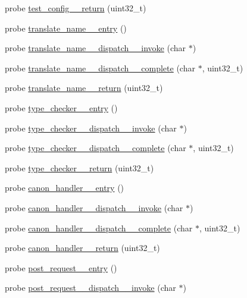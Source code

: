 \begin{DoxyCompactItemize}
\item 
probe \hyperlink{apache__probes_8d_a3b8cf4cf0330f7ebe23c3e14642e0d8b}{test\+\_\+config\+\_\+\+\_\+return} (uint32\+\_\+t)
\item 
probe \hyperlink{apache__probes_8d_ae606fd6e5357ce6847f930460e9aa293}{translate\+\_\+name\+\_\+\+\_\+entry} ()
\item 
probe \hyperlink{apache__probes_8d_a65c3cea1dc4b20ad04e450278219a3a0}{translate\+\_\+name\+\_\+\+\_\+dispatch\+\_\+\+\_\+invoke} (char $\ast$)
\item 
probe \hyperlink{apache__probes_8d_a0b8d45d195da1f21a4270103e4fae5e8}{translate\+\_\+name\+\_\+\+\_\+dispatch\+\_\+\+\_\+complete} (char $\ast$, uint32\+\_\+t)
\item 
probe \hyperlink{apache__probes_8d_a58fc6cb50bea00f01041b081ec217e69}{translate\+\_\+name\+\_\+\+\_\+return} (uint32\+\_\+t)
\item 
probe \hyperlink{apache__probes_8d_ad76c4fac2c9a4adf8c6f219048fbad09}{type\+\_\+checker\+\_\+\+\_\+entry} ()
\item 
probe \hyperlink{apache__probes_8d_ae926644a3b2aa33a919a04205e4074ad}{type\+\_\+checker\+\_\+\+\_\+dispatch\+\_\+\+\_\+invoke} (char $\ast$)
\item 
probe \hyperlink{apache__probes_8d_a5963d29d6437345691b624f52e7b9feb}{type\+\_\+checker\+\_\+\+\_\+dispatch\+\_\+\+\_\+complete} (char $\ast$, uint32\+\_\+t)
\item 
probe \hyperlink{apache__probes_8d_a8e8b60dc5433a0237d2a58a4b9490a00}{type\+\_\+checker\+\_\+\+\_\+return} (uint32\+\_\+t)
\item 
probe \hyperlink{apache__probes_8d_aee0d2dbeefe4f5f6b6fe9d4c2e18a552}{canon\+\_\+handler\+\_\+\+\_\+entry} ()
\item 
probe \hyperlink{apache__probes_8d_a0b042051a18d376cdca0937e6c432ade}{canon\+\_\+handler\+\_\+\+\_\+dispatch\+\_\+\+\_\+invoke} (char $\ast$)
\item 
probe \hyperlink{apache__probes_8d_a0157a8735d46cea72182dd007aeb280e}{canon\+\_\+handler\+\_\+\+\_\+dispatch\+\_\+\+\_\+complete} (char $\ast$, uint32\+\_\+t)
\item 
probe \hyperlink{apache__probes_8d_a479aca7f897a7a5de0f06c336077d538}{canon\+\_\+handler\+\_\+\+\_\+return} (uint32\+\_\+t)
\item 
probe \hyperlink{apache__probes_8d_afefc0e16e89f63f3256ab0afe439143e}{post\+\_\+request\+\_\+\+\_\+entry} ()
\item 
probe \hyperlink{apache__probes_8d_a460f256be67818b937c3c3924a9e9b44}{post\+\_\+request\+\_\+\+\_\+dispatch\+\_\+\+\_\+invoke} (char $\ast$)

\end{DoxyCompactItemize}
